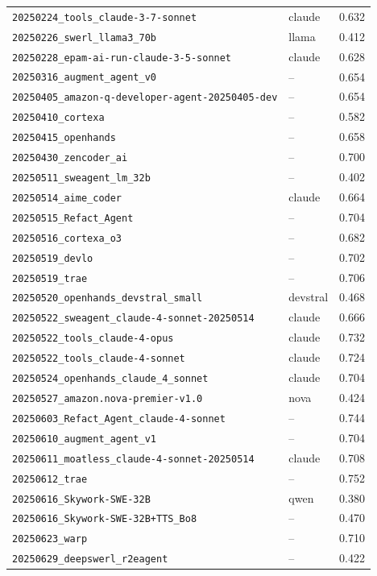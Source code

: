 \documentclass{article}
\begin{document}
\begin{center}
\begin{longtable}{llc}
\texttt{20250224\_tools\_claude-3-7-sonnet} & claude & 0.632 \\
\texttt{20250226\_swerl\_llama3\_70b} & llama & 0.412 \\
\texttt{20250228\_epam-ai-run-claude-3-5-sonnet} & claude & 0.628 \\
\texttt{20250316\_augment\_agent\_v0} & -- & 0.654 \\
\texttt{20250405\_amazon-q-developer-agent-20250405-dev} & -- & 0.654 \\
\texttt{20250410\_cortexa} & -- & 0.582 \\
\texttt{20250415\_openhands} & -- & 0.658 \\
\texttt{20250430\_zencoder\_ai} & -- & 0.700 \\
\texttt{20250511\_sweagent\_lm\_32b} & -- & 0.402 \\
\texttt{20250514\_aime\_coder} & claude & 0.664 \\
\texttt{20250515\_Refact\_Agent} & -- & 0.704 \\
\texttt{20250516\_cortexa\_o3} & -- & 0.682 \\
\texttt{20250519\_devlo} & -- & 0.702 \\
\texttt{20250519\_trae} & -- & 0.706 \\
\texttt{20250520\_openhands\_devstral\_small} & devstral & 0.468 \\
\texttt{20250522\_sweagent\_claude-4-sonnet-20250514} & claude & 0.666 \\
\texttt{20250522\_tools\_claude-4-opus} & claude & 0.732 \\
\texttt{20250522\_tools\_claude-4-sonnet} & claude & 0.724 \\
\texttt{20250524\_openhands\_claude\_4\_sonnet} & claude & 0.704 \\
\texttt{20250527\_amazon.nova-premier-v1.0} & nova & 0.424 \\
\texttt{20250603\_Refact\_Agent\_claude-4-sonnet} & -- & 0.744 \\
\texttt{20250610\_augment\_agent\_v1} & -- & 0.704 \\
\texttt{20250611\_moatless\_claude-4-sonnet-20250514} & claude & 0.708 \\
\texttt{20250612\_trae} & -- & 0.752 \\
\texttt{20250616\_Skywork-SWE-32B} & qwen & 0.380 \\
\texttt{20250616\_Skywork-SWE-32B+TTS\_Bo8} & -- & 0.470 \\
\texttt{20250623\_warp} & -- & 0.710 \\
\texttt{20250629\_deepswerl\_r2eagent} & -- & 0.422 \\

\end{longtable}
\end{center}
\end{document}
